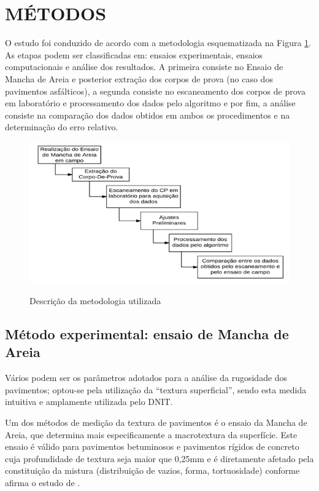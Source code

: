 \section{MÉTODOS}
O estudo foi conduzido de acordo com a metodologia esquematizada na Figura \ref{Fig:metodo}. As etapas podem ser classificadas em: ensaios experimentais, ensaios computacionais e análise dos resultados. A primeira consiste no Ensaio de Mancha de Areia e posterior extração dos corpos de prova (no caso dos pavimentos asfálticos), a segunda consiste no escaneamento dos corpos de prova em laboratório e processamento dos dados pelo algoritmo e por fim, a análise consiste na comparação dos dados obtidos em ambos os procedimentos e na determinação do erro relativo.  

\begin{figure}[!ht]
\centering
{\includegraphics[scale=1]{figures/metodo.jpg}}\\
\caption{Descrição da metodologia utilizada} 
\label{Fig:metodo}
\end{figure}

\subsection{Método experimental: ensaio de Mancha de Areia}
Vários podem ser os parâmetros adotados para a análise da rugosidade dos pavimentos; optou-se pela utilização da  “textura superficial”, sendo esta medida intuitiva e amplamente utilizada pelo DNIT.

Um dos métodos de medição da textura de pavimentos é o ensaio da Mancha de Areia, que determina mais especificamente a macrotextura da superfície. Este ensaio é válido para pavimentos betuminosos e pavimentos rígidos de concreto cuja profundidade de textura seja maior que 0,25mm e é diretamente afetado pela constituição da mistura (distribuição de vazios, forma, tortuosidade) conforme afirma o estudo de .

